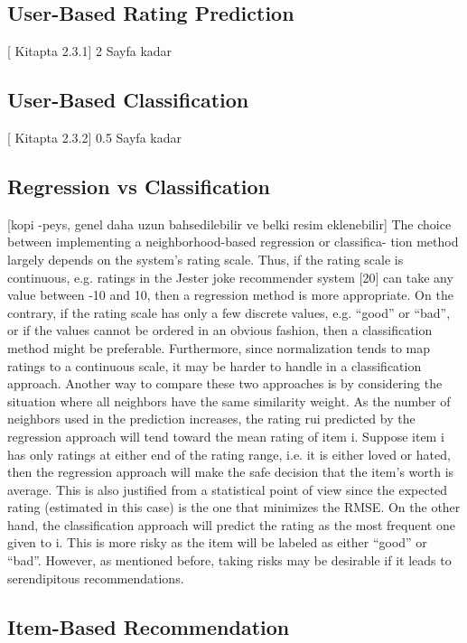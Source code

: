 \subsection{User-Based Rating Prediction}

[ Kitapta 2.3.1] 2 Sayfa kadar

\subsection{User-Based Classification}

[ Kitapta 2.3.2] 0.5 Sayfa kadar

\subsection{Regression vs Classification}

[kopi -peys, genel daha uzun bahsedilebilir ve belki resim eklenebilir]
The choice between implementing a neighborhood-based regression or classifica- tion method largely depends on the system’s rating scale. Thus, if the rating scale is continuous, e.g. ratings in the Jester joke recommender system [20] can take any value between -10 and 10, then a regression method is more appropriate. On the contrary, if the rating scale has only a few discrete values, e.g. “good” or “bad”, or if the values cannot be ordered in an obvious fashion, then a classification method might be preferable. Furthermore, since normalization tends to map ratings to a continuous scale, it may be harder to handle in a classification approach.
Another way to compare these two approaches is by considering the situation where all neighbors have the same similarity weight. As the number of neighbors used in the prediction increases, the rating rui predicted by the regression approach will tend toward the mean rating of item i. Suppose item i has only ratings at either end of the rating range, i.e. it is either loved or hated, then the regression approach will make the safe decision that the item’s worth is average. This is also justified from a statistical point of view since the expected rating (estimated in this case) is the one that minimizes the RMSE. On the other hand, the classification approach will predict the rating as the most frequent one given to i. This is more risky as the item will be labeled as either “good” or “bad”. However, as mentioned before, taking risks may be desirable if it leads to serendipitous recommendations.

\subsection{Item-Based Recommendation}

